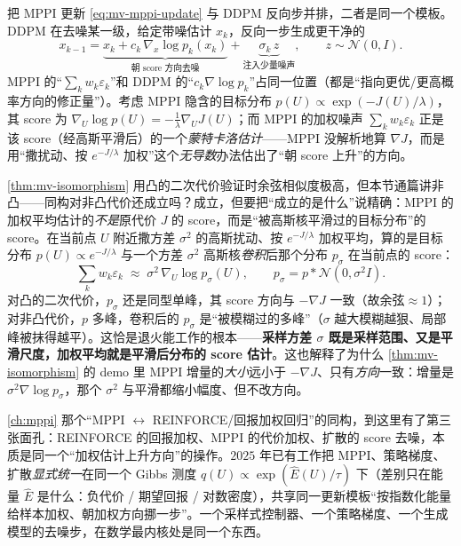 \begin{theorem}[MPPI 一步 $=$ 单步去噪 $=$ 一步 score 上升]\label{thm:mv-isomorphism}
把 MPPI 更新 \cref{eq:mv-mppi-update} 与 DDPM 反向步并排，二者是同一个模板。DDPM 在去噪某一级，给定带噪估计 $x_k$，反向一步生成更干净的
\begin{equation}
  x_{k-1}=\underbrace{x_k+c_k\,\nabla_x\log p_k(x_k)}_{\text{朝 score 方向去噪}}+\underbrace{\sigma_k\,z}_{\text{注入少量噪声}},\qquad z\sim\mathcal{N}(0,I).
  \label{eq:mv-ddpm-reverse}
\end{equation}
MPPI 的“$\sum_k w_k\varepsilon_k$”和 DDPM 的“$c_k\nabla\log p_k$”占同一位置（都是“指向更优/更高概率方向的修正量”）。考虑 MPPI 隐含的目标分布 $p(U)\propto\exp(-J(U)/\lambda)$，其 score 为 $\nabla_U\log p(U)=-\tfrac{1}{\lambda}\nabla_U J(U)$；而 MPPI 的加权噪声 $\sum_k w_k\varepsilon_k$ 正是该 score（经高斯平滑后）的一个\emph{蒙特卡洛估计}——MPPI 没解析地算 $\nabla J$，而是用“撒扰动、按 $e^{-J/\lambda}$ 加权”这个\emph{无导数}办法估出了“朝 score 上升”的方向\cite{pan2024mbd}。
\end{theorem}

\begin{derivation}[采样方差就是平滑尺度]
\cref{thm:mv-isomorphism} 用凸的二次代价验证时余弦相似度极高，但本节通篇讲非凸——同构对非凸代价还成立吗？成立，但要把“成立的是什么”说精确：MPPI 的加权平均估计的\emph{不是}原代价 $J$ 的 score，而是“被高斯核平滑过的目标分布”的 score。在当前点 $U$ 附近撒方差 $\sigma^2$ 的高斯扰动、按 $e^{-J/\lambda}$ 加权平均，算的是目标分布 $p(U)\propto e^{-J/\lambda}$ 与一个方差 $\sigma^2$ 高斯核\emph{卷积}后那个分布 $p_\sigma$ 在当前点的 score：
\begin{equation}
  \sum_k w_k\varepsilon_k \;\approx\; \sigma^2\,\nabla_U\log p_\sigma(U),\qquad p_\sigma=p * \mathcal{N}(0,\sigma^2 I).
  \label{eq:mv-smoothed-score}
\end{equation}
对凸的二次代价，$p_\sigma$ 还是同型单峰，其 score 方向与 $-\nabla J$ 一致（故余弦$\approx1$）；对非凸代价，$p$ 多峰，卷积后的 $p_\sigma$ 是“被模糊过的多峰”（$\sigma$ 越大模糊越狠、局部峰被抹得越平）。这恰是退火能工作的根本——\textbf{采样方差 $\sigma$ 既是采样范围、又是平滑尺度，加权平均就是平滑后分布的 score 估计}。这也解释了为什么 \cref{thm:mv-isomorphism} 的 demo 里 MPPI 增量的\emph{大小}远小于 $-\nabla J$、只有\emph{方向}一致：增量是 $\sigma^2\nabla\log p_\sigma$，那个 $\sigma^2$ 与平滑都缩小幅度、但不改方向。
\end{derivation}

\begin{insight}
\cref{ch:mppi} 那个“MPPI $\leftrightarrow$ REINFORCE/回报加权回归”的同构，到这里有了第三张面孔：REINFORCE 的回报加权、MPPI 的代价加权、扩散的 score 去噪，本质是同一个“加权估计上升方向”的操作。$2025$ 年已有工作把 MPPI、策略梯度、扩散\emph{显式统一}在同一个 Gibbs 测度 $q(U)\propto\exp(\hat E(U)/\tau)$ 下\cite{li2025unified}（差别只在能量 $\hat E$ 是什么：负代价 / 期望回报 / 对数密度），共享同一更新模板“按指数化能量给样本加权、朝加权方向挪一步”。一个采样式控制器、一个策略梯度、一个生成模型的去噪步，在数学最内核处是同一个东西。
\end{insight}

